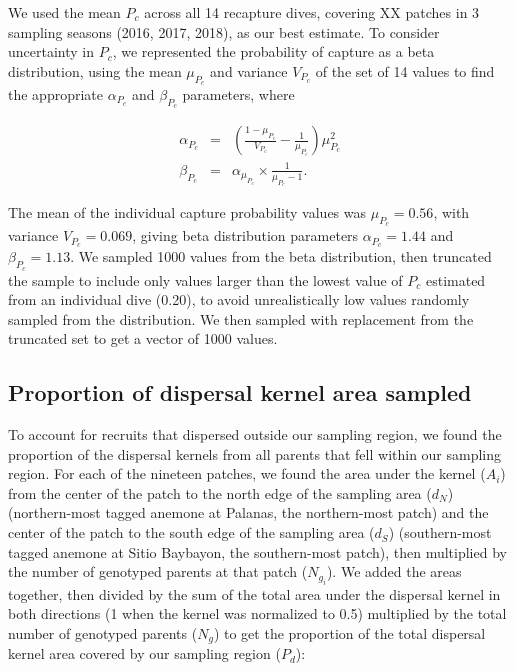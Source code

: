 \documentclass[12pt, oneside]{article}   	%
\begin{document}
We used the mean $P_c$ across all 14 recapture dives, covering XX patches in 3 sampling seasons (2016, 2017, 2018), as our best estimate. To consider uncertainty in $P_c$, we represented the probability of capture as a beta distribution, using the mean $\mu_{P_c}$ and variance $V_{P_c}$ of the set of 14 values to find the appropriate $\alpha_{P_c}$ and $\beta_{P_c}$ parameters, where 

\begin{eqnarray}
\alpha_{P_c} &=& (\frac{1-\mu_{P_c}}{V_{P_c}} - \frac{1}{\mu_{P_c}}) \mu_{P_c}^2 \\
\beta_{P_c} &=& \alpha_{\mu_{P_c}} \times \frac{1}{\mu_{P_c} - 1}. \label{APP_EQN_ProbCapBetaDistParams}  %
\end{eqnarray}

The mean of the individual capture probability values was $\mu_{P_c} = 0.56$, with variance $V_{P_c} = 0.069$, giving beta distribution parameters $\alpha_{P_c} = 1.44$ and $\beta_{P_c} = 1.13$. We sampled 1000 values from the beta distribution, then truncated the sample to include only values larger than the lowest value of $P_c$ estimated from an individual dive (0.20), to avoid unrealistically low values randomly sampled from the distribution. We then sampled with replacement from the truncated set to get a vector of 1000 values.

\subsection{Proportion of dispersal kernel area sampled} \label{APP_SEC_PropDispKernelSampled}

To account for recruits that dispersed outside our sampling region, we found the proportion of the dispersal kernels from all parents that fell within our sampling region. For each of the nineteen patches, we found the area under the kernel ($A_i$) from the center of the patch to the north edge of the sampling area ($d_N$) (northern-most tagged anemone at Palanas, the northern-most patch) and the center of the patch to the south edge of the sampling area ($d_S$) (southern-most tagged anemone at Sitio Baybayon, the southern-most patch), then multiplied by the number of genotyped parents at that patch ($N_{g_i}$). We added the areas together, then divided by the sum of the total area under the dispersal kernel in both directions (1 when the kernel was normalized to 0.5) multiplied by the total number of genotyped parents ($N_g$) to get the proportion of the total dispersal kernel area covered by our sampling region ($P_d$):
\end{document}
